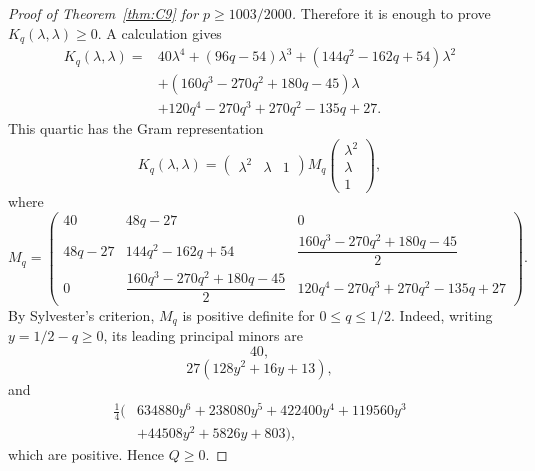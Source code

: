 \documentclass[11pt]{article}
\begin{document}
\begin{proof}[Proof of Theorem~\ref{thm:C9} for $p\ge1003/2000$]
Therefore it is enough to prove $K_q(\lambda,\lambda)\ge0$.  A calculation gives
\begin{equation}\label{eq:Kll}
\begin{aligned}
K_q(\lambda,\lambda)={}&40\lambda^4+(96q-54)\lambda^3
+(144q^2-162q+54)\lambda^2\\
&+(160q^3-270q^2+180q-45)\lambda\\
&+120q^4-270q^3+270q^2-135q+27.
\end{aligned}
\end{equation}
This quartic has the Gram representation
\[
        K_q(\lambda,\lambda)
        =\begin{pmatrix}\lambda^2&\lambda&1\end{pmatrix}
        M_q
        \begin{pmatrix}\lambda^2\\\lambda\\1\end{pmatrix},
\]
where
\[
M_q=
\begin{pmatrix}
40 & 48q-27 & 0\\
48q-27 & 144q^2-162q+54 & \dfrac{160q^3-270q^2+180q-45}{2}\\
0 & \dfrac{160q^3-270q^2+180q-45}{2}
&120q^4-270q^3+270q^2-135q+27
\end{pmatrix}.
\]
By Sylvester's criterion, $M_q$ is positive definite for $0\le q\le1/2$.  Indeed, writing $y=1/2-q\ge0$, its leading principal minors are
\[
        40,
\]
\[
        27(128y^2+16y+13),
\]
and
\[
\begin{aligned}
\frac14(&634880y^6+238080y^5+422400y^4+119560y^3\\
&+44508y^2+5826y+803),
\end{aligned}
\]
which are positive.  Hence $Q\ge0$.


\end{proof}
\end{document}
